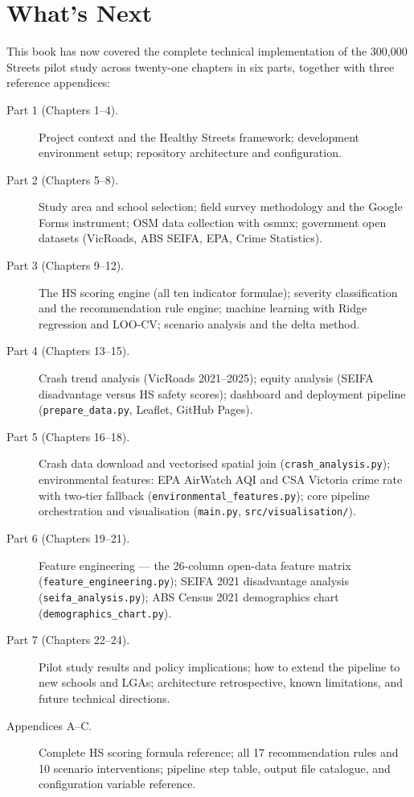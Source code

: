 \documentclass[11pt,a4paper,openany]{book}
\begin{document}
\backmatter

\chapter*{What's Next}

This book has now covered the complete technical implementation of the 300,000 Streets
pilot study across twenty-one chapters in six parts, together with three reference
appendices:

\medskip
\begin{description}
  \item[Part 1 (Chapters 1--4).] Project context and the Healthy Streets framework;
    development environment setup; repository architecture and configuration.
  \item[Part 2 (Chapters 5--8).] Study area and school selection; field survey methodology
    and the Google Forms instrument; OSM data collection with osmnx; government open
    datasets (VicRoads, ABS SEIFA, EPA, Crime Statistics).
  \item[Part 3 (Chapters 9--12).] The HS scoring engine (all ten indicator formulae);
    severity classification and the recommendation rule engine; machine learning with
    Ridge regression and LOO-CV; scenario analysis and the delta method.
  \item[Part 4 (Chapters 13--15).] Crash trend analysis (VicRoads 2021--2025);
    equity analysis (SEIFA disadvantage versus HS safety scores); dashboard and
    deployment pipeline (\texttt{prepare\_data.py}, Leaflet, GitHub Pages).
  \item[Part 5 (Chapters 16--18).] Crash data download and vectorised spatial join
    (\texttt{crash\_analysis.py}); environmental features: EPA AirWatch AQI and
    CSA Victoria crime rate with two-tier fallback (\texttt{environmental\_features.py});
    core pipeline orchestration and visualisation (\texttt{main.py},
    \texttt{src/visualisation/}).
  \item[Part 6 (Chapters 19--21).] Feature engineering --- the 26-column open-data
    feature matrix (\texttt{feature\_engineering.py}); SEIFA 2021 disadvantage
    analysis (\texttt{seifa\_analysis.py}); ABS Census 2021 demographics chart
    (\texttt{demographics\_chart.py}).
  \item[Part 7 (Chapters 22--24).] Pilot study results and policy implications;
    how to extend the pipeline to new schools and LGAs; architecture retrospective,
    known limitations, and future technical directions.
  \item[Appendices A--C.] Complete HS scoring formula reference; all 17 recommendation
    rules and 10 scenario interventions; pipeline step table, output file catalogue,
    and configuration variable reference.
\end{description}
\end{document}
